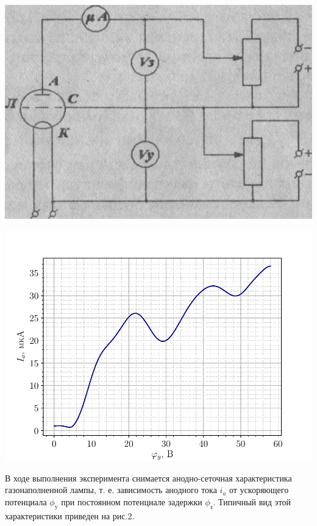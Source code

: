 \begin{center}
    \begin{minipage}[h]{0.49\linewidth}
        \includegraphics[width=\linewidth]{fig/R1.png} 
        \label{fig:1}

    \end{minipage}
    \begin{minipage}[h]{0.49\linewidth}
        \includegraphics[width=\linewidth]{fig/1} 
        \label{fig:2}

      \end{minipage}
\end{center}

В ходе выполнения эксперимента снимается анодно-сеточная характеристика газонаполненной лампы, т. е. зависимость анодного 
тока $i_a$ от ускоряющего потенциала $\phi_{\text{y}}$ при постоянном потенциале задержки $\phi_{\text{з}}$. Типичный вид этой характеристики приведен на рис.2.

